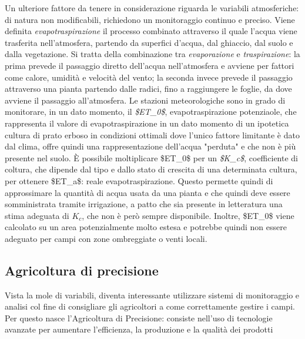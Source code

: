 \documentclass[12pt,a4paper,openright,twoside]{book}
\begin{document}
Un ulteriore fattore da tenere in considerazione riguarda le variabili atmosferiche: di natura non modificabili, richiedono un monitoraggio continuo e preciso. Viene definita \textit{evapotraspirazione} il processo combinato attraverso il quale l'acqua viene trasferita nell'atmosfera, partendo da superfici d'acqua, dal ghiaccio, dal suolo e dalla vegetazione\cite{Kirkham2014}. Si tratta della combinazione tra \textit{evaporazione} e \textit{traspirazione}: la prima prevede il passaggio diretto dell'acqua nell'atmosfera e avviene per fattori come calore, umidità e velocità del vento; la seconda invece prevede il passaggio attraverso una pianta partendo dalle radici, fino a raggiungere le foglie, da dove avviene il passaggio all'atmosfera.
Le stazioni meteorologiche\cite{Allen1998CropE} sono in grado di monitorare, in un dato momento, il \textit{\ac{$ET_0$}}, evapotraspirazione potenziaole, che rappresenta il valore di evapotraspirazione in un dato momento di un ipotetica cultura di prato erboso in condizioni ottimali dove l'unico fattore limitante è dato dal clima, offre quindi una rappresentazione dell'acqua "perduta" e che non è più presente nel suolo. È possibile moltiplicare \ac{$ET_0$} per un \textit{\ac{$K_c$}}, coefficiente di coltura, che dipende dal tipo e dallo stato di crescita di una determinata cultura, per ottenere \ac{$ET_a$}: reale evapotraspirazione.
Questo permette quindi di approssimare la quantità di acqua usata da una pianta e che quindi deve essere somministrata tramite irrigazione, a patto che sia presente in letteratura una stima adeguata di $K_c$, che non è però sempre disponibile. Inoltre, \ac{$ET_0$} viene calcolato su un area potenzialmente molto estesa e potrebbe quindi non essere adeguato per campi con zone ombreggiate o venti locali.

\subsection{Agricoltura di precisione}\label{agricoltura-precisione-tipi}

Vista la mole di variabili, diventa interessante utilizzare sistemi di monitoraggio e analisi col fine di consigliare gli agricoltori a come correttamente gestire i campi. Per questo nasce l'Agricoltura di Precisione: consiste nell'uso di tecnologie avanzate per aumentare l'efficienza, la produzione e la qualità dei prodotti\cite{ZHANG2002113}
\end{document}
